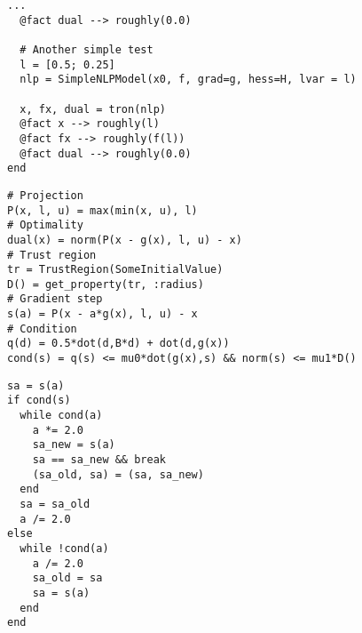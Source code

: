 \begin{frame}[t,fragile]
\begin{lstlisting}[basicstyle=\scriptsize\tt]
  ...
  @fact dual --> roughly(0.0)

  # Another simple test
  l = [0.5; 0.25]
  nlp = SimpleNLPModel(x0, f, grad=g, hess=H, lvar = l)

  x, fx, dual = tron(nlp)
  @fact x --> roughly(l)
  @fact fx --> roughly(f(l))
  @fact dual --> roughly(0.0)
end
\end{lstlisting}
\end{frame}


\begin{frame}[t,fragile]
\begin{lstlisting}[basicstyle=\scriptsize\tt]
# Projection
P(x, l, u) = max(min(x, u), l)
# Optimality
dual(x) = norm(P(x - g(x), l, u) - x)
# Trust region
tr = TrustRegion(SomeInitialValue)
D() = get_property(tr, :radius)
# Gradient step
s(a) = P(x - a*g(x), l, u) - x
# Condition
q(d) = 0.5*dot(d,B*d) + dot(d,g(x))
cond(s) = q(s) <= mu0*dot(g(x),s) && norm(s) <= mu1*D()
\end{lstlisting}
\end{frame}

\begin{frame}[t,fragile]
\begin{lstlisting}[basicstyle=\scriptsize\tt]
sa = s(a)
if cond(s)
  while cond(a)
    a *= 2.0
    sa_new = s(a)
    sa == sa_new && break
    (sa_old, sa) = (sa, sa_new)
  end
  sa = sa_old
  a /= 2.0
else
  while !cond(a)
    a /= 2.0
    sa_old = sa
    sa = s(a)
  end
end
\end{lstlisting}
\end{frame}


